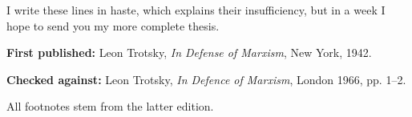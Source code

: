 I write these lines in haste, which explains their insufficiency, but in a week I hope to send you my more complete thesis.


\begin{letterinfo}
  \textbf{First published:} Leon Trotsky, \emph{In Defense of Marxism}, New York, 1942.
	
  \textbf{Checked against:} Leon Trotsky, \emph{In Defence of Marxism}, London 1966, pp. 1--2.
	
  All footnotes stem from the latter edition.
\end{letterinfo}